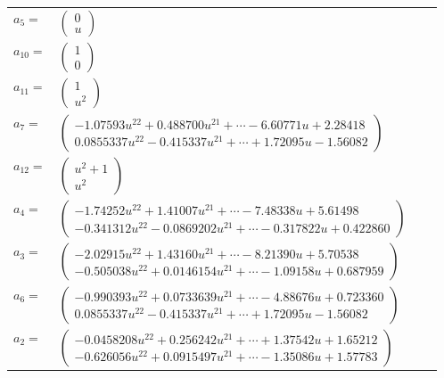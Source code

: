 \documentclass[1p]{elsarticle_modified}
\theoremstyle{definition}
\begin{document}
\begin{tabular}{m{7pt} m{180pt} m{7pt} m{180pt} }
\flushright $a_{5}=$&$\begin{pmatrix}0\\u\end{pmatrix}$ \\
\flushright $a_{10}=$&$\begin{pmatrix}1\\0\end{pmatrix}$ \\
\flushright $a_{11}=$&$\begin{pmatrix}1\\u^2\end{pmatrix}$ \\
\flushright $a_{7}=$&$\begin{pmatrix}-1.07593 u^{22}+0.488700 u^{21}+\cdots-6.60771 u+2.28418\\0.0855337 u^{22}-0.415337 u^{21}+\cdots+1.72095 u-1.56082\end{pmatrix}$ \\
\flushright $a_{12}=$&$\begin{pmatrix}u^2+1\\u^2\end{pmatrix}$ \\
\flushright $a_{4}=$&$\begin{pmatrix}-1.74252 u^{22}+1.41007 u^{21}+\cdots-7.48338 u+5.61498\\-0.341312 u^{22}-0.0869202 u^{21}+\cdots-0.317822 u+0.422860\end{pmatrix}$ \\
\flushright $a_{3}=$&$\begin{pmatrix}-2.02915 u^{22}+1.43160 u^{21}+\cdots-8.21390 u+5.70538\\-0.505038 u^{22}+0.0146154 u^{21}+\cdots-1.09158 u+0.687959\end{pmatrix}$ \\
\flushright $a_{6}=$&$\begin{pmatrix}-0.990393 u^{22}+0.0733639 u^{21}+\cdots-4.88676 u+0.723360\\0.0855337 u^{22}-0.415337 u^{21}+\cdots+1.72095 u-1.56082\end{pmatrix}$ \\
\flushright $a_{2}=$&$\begin{pmatrix}-0.0458208 u^{22}+0.256242 u^{21}+\cdots+1.37542 u+1.65212\\-0.626056 u^{22}+0.0915497 u^{21}+\cdots-1.35086 u+1.57783\end{pmatrix}$ \\

\end{tabular}
\end{document}
